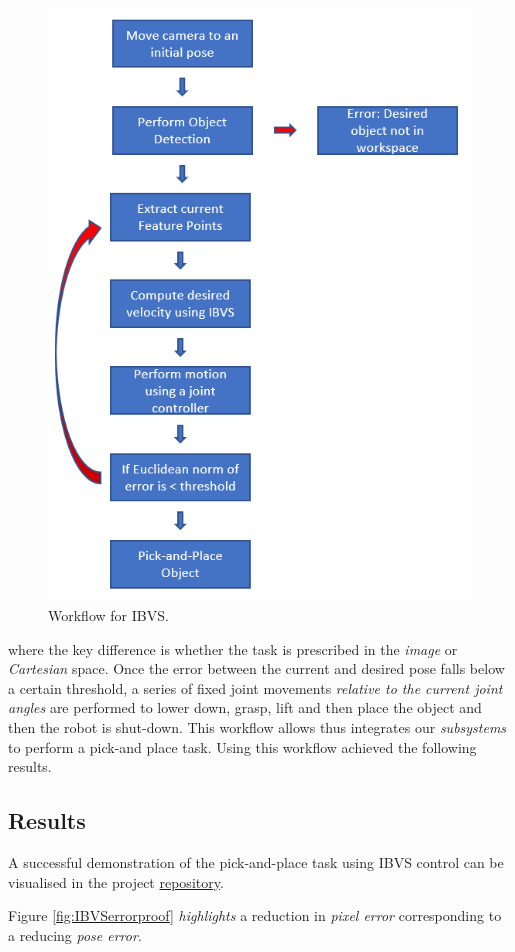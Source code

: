 \documentclass{UoNMCHA}
\numberwithin{equation}{section}
\begin{document}
\begin{figure}[H]
	\begin{center}
		\includegraphics[width=.6\linewidth]{Figures/IBVSworkflow}
		\caption{Workflow for IBVS.}
		\label{fig:IBVSworkflow}
	\end{center}
\end{figure}

where the key difference is whether the task is prescribed in the \textit{image} or \textit{Cartesian} space. Once the error between the current and desired pose falls below a certain threshold, a series of fixed joint movements \textit{relative to the current joint angles} are performed to lower down, grasp, lift and then place the object and then the robot is shut-down. This workflow allows thus integrates our \textit{subsystems} to perform a pick-and place task. 
Using this workflow achieved the following results.

\subsection{Results}\label{Results}

A successful demonstration of the pick-and-place task using IBVS control can be visualised in the project \href{https://github.com/Hashkhan98/Vision-Based-Control-of-an-Industrial-Robotic-Manipulator}{repository}.

Figure \ref{fig:IBVSerrorproof} \textit{highlights} a reduction in \textit{pixel error} corresponding to a reducing \textit{pose error}.
\end{document}
